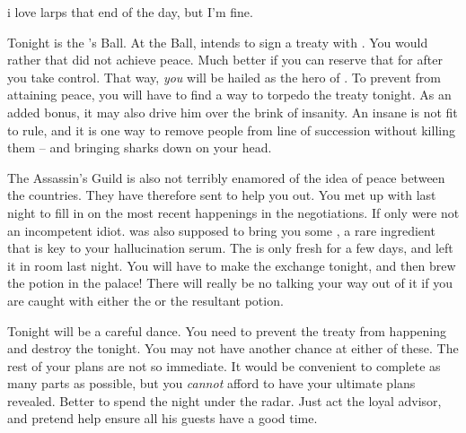 i love larps that end of the day, but I'm fine.\documentclass[char]{NeptuneBall}
\begin{document}
Tonight is the \cExExKing{}'s Ball. At the Ball, \cKing{\King} \cKing{} intends to sign a treaty with \pPacifica{}. You would rather that \cKing{} did not achieve peace. Much better if you can reserve that for after you take control. That way, \emph{you} will be hailed as the hero of \pAtlantis{}. To prevent \cKing{} from attaining peace, you will have to find a way to torpedo the treaty tonight. As an added bonus, it may also drive him over the brink of insanity. An insane \cKing{\King} is not fit to rule, and it is one way to remove people from line of succession without killing them -- and bringing sharks down on your head.

The Assassin's Guild is also not terribly enamored of the idea of peace between the countries. They have therefore sent \cSpy{} to help you out. You met up with \cSpy{\them} last night to fill \cSpy{\them} in on the most recent happenings in the negotiations. If only \cSpy{} were not an incompetent idiot.  \cSpy{\They} was also supposed to bring you some \iHemlock{}, a rare ingredient that is key to your hallucination serum. The \iHemlock{} is only fresh for a few days, and \cSpy{} left it in \cSpy{\them} room last night. You will have to make the exchange tonight, and then brew the potion in the palace! There will really be no talking your way out of it if you are caught with either the \iHemlock{} or the resultant potion.

Tonight will be a careful dance. You need to prevent the treaty from happening and destroy the \iMusicBox{} tonight. You may not have another chance at either of these. The rest of your plans are not so immediate. It would be convenient to complete as many parts as possible, but you \emph{cannot} afford to have your ultimate plans revealed. Better to spend the night under the radar. Just act the loyal advisor, and pretend help \cKing{} ensure all his guests have a good time.
\end{document}
